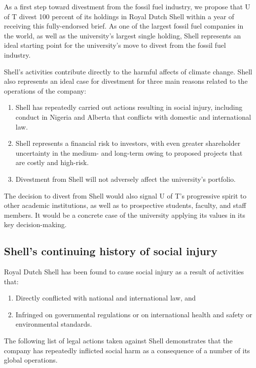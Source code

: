 \documentclass[10pt]{article}
\begin{document}
As a first step toward divestment from the fossil fuel industry, we propose that U of T divest 100 percent of its holdings in Royal Dutch Shell within a year of receiving this fully-endorsed brief.
As one of the largest fossil fuel companies in the world, as well as the university's largest single holding, Shell represents an ideal starting point for the university's move to divest from the fossil fuel industry.
		

			
Shell's activities contribute directly to the harmful affects of climate change.
Shell also represents an ideal case for divestment for three main reasons related to the operations of the company: 
\begin{enumerate}
	\item Shell has repeatedly carried out actions resulting in social injury, including conduct in Nigeria and Alberta that conflicts with domestic and international law.
	\item Shell represents a financial risk to investors, with even greater shareholder uncertainty in the medium- and long-term owing to proposed projects that are costly and high-risk.
	\item Divestment from Shell will not adversely affect the university's portfolio.
\end{enumerate}
The decision to divest from Shell would also signal U of T's progressive spirit to other academic institutions, as well as to prospective students, faculty, and staff members.
It would be a concrete case of the university applying its values in its key decision-making.



	\subsection{Shell's continuing history of social injury}



Royal Dutch Shell has been found to cause social injury as a result of activities that:
\begin{enumerate}
	\item Directly conflicted with national and international law, and
	\item Infringed on governmental regulations or on international health and safety or environmental standards. 
\end{enumerate}
The following list of legal actions taken against Shell demonstrates that the company has repeatedly inflicted social harm as a consequence of a number of its global operations.
\end{document}
